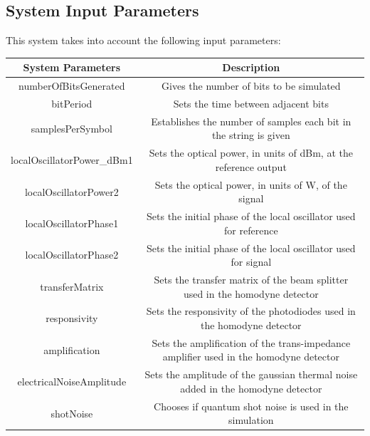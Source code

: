 \subsection*{System Input Parameters}

This system takes into account the following input parameters:
\begin{table}[H]
\centering
\begin{tabulary}{1.0\textwidth}{|C|C|}
\hline
\textbf{System Parameters} & \textbf{Description}                                                                   \\ \hline
numberOfBitsGenerated      & Gives the number of bits to be simulated                                               \\ \hline
bitPeriod                  & Sets the time between adjacent bits                                                    \\ \hline
samplesPerSymbol           & Establishes the number of samples each bit in the string is given                      \\ \hline
localOscillatorPower\_dBm1 & Sets the optical power, in units of dBm, at the reference output	                      \\ \hline
localOscillatorPower2      & Sets the optical power, in units of W, of the signal                                   \\ \hline
localOscillatorPhase1      & Sets the initial phase of the local oscillator used for reference                      \\ \hline
localOscillatorPhase2      & Sets the initial phase of the local oscillator used for signal                         \\ \hline
transferMatrix             & Sets the transfer matrix of the beam splitter used in the homodyne detector            \\ \hline
responsivity               & Sets the responsivity of the photodiodes used in the homodyne detector                 \\ \hline
amplification              & Sets the amplification of the trans-impedance amplifier used in the homodyne detector  \\ \hline
electricalNoiseAmplitude   & Sets the amplitude of the gaussian thermal noise added in the homodyne detector        \\ \hline
shotNoise                  & Chooses if quantum shot noise is used in the simulation                                \\ \hline
\end{tabulary}
\end{table}		

